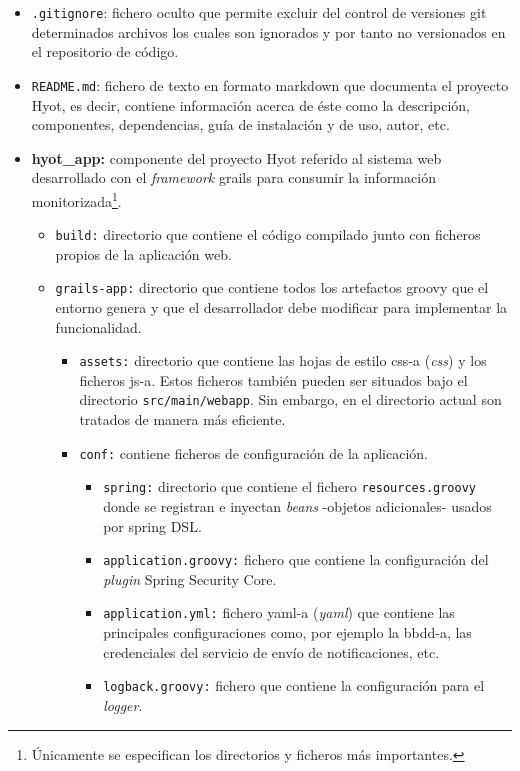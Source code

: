 \documentclass[12pt,a4paper, twoside]{report}
\begin{document}
	\begin{itemize}
		\item \texttt{.gitignore}: fichero oculto que permite excluir del control de versiones \gls{git} determinados archivos los cuales son ignorados y por tanto no versionados en el repositorio de código.
		\item \texttt{README.md}: fichero de texto en formato \gls{markdown} que documenta el proyecto Hyot, es decir, contiene información acerca de éste como la descripción, componentes, dependencias, guía de instalación y de uso, autor, etc.
		
		\item \textbf{hyot\_app:} componente del proyecto Hyot referido al sistema web desarrollado con el \textit{\gls{framework}} \gls{grails} para consumir la información monitorizada\footnote{Únicamente se especifican los directorios y ficheros más importantes.}.
			
		\begin{itemize}
			\item \texttt{build:} directorio que contiene el código compilado junto con ficheros propios de la aplicación web.
	
			\item \texttt{grails-app:} directorio que contiene todos los artefactos \gls{groovy} que el entorno genera y que el desarrollador debe modificar para implementar la funcionalidad.
				 
			\begin{itemize}
				\item \texttt{assets:} directorio que contiene las hojas de estilo \gls{css-a} (\textit{\gls{css}}) y los ficheros \gls{js-a}. Estos ficheros también pueden ser situados bajo el directorio \texttt{src/main/webapp}. Sin embargo, en el directorio actual son tratados de manera más eficiente. 
				\item \texttt{conf:} contiene ficheros de configuración de la aplicación.
						
				\begin{itemize}
					\item \texttt{spring:} directorio que contiene el fichero \texttt{resources.groovy} donde se registran e inyectan \textit{beans} -objetos adicionales- usados por \Gls{spring} DSL.
					\item \texttt{application.groovy:} fichero que contiene la configuración del \textit{\gls{plugin}} Spring Security Core.
					\item \texttt{application.yml:} fichero \gls{yaml-a} (\textit{\gls{yaml}}) que contiene las principales configuraciones como, por ejemplo la \gls{bbdd-a}, las credenciales del servicio de envío de notificaciones, etc.
					\item \texttt{logback.groovy:} fichero que contiene la configuración para el \textit{logger}.				
				\end{itemize}
						

\end{itemize}
\end{itemize}
\end{itemize}
\end{document}
